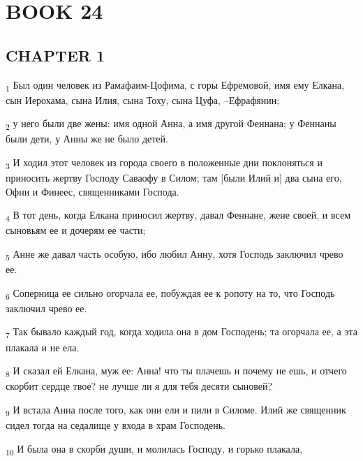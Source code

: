 \section{BOOK 24}
\subsection{CHAPTER 1}
\begin{tcolorbox}
\textsubscript{1} Был один человек из Рамафаим-Цофима, с горы Ефремовой, имя ему Елкана, сын Иерохама, сына Илия, сына Тоху, сына Цуфа, --Ефрафянин;
\end{tcolorbox}
\begin{tcolorbox}
\textsubscript{2} у него были две жены: имя одной Анна, а имя другой Феннана; у Феннаны были дети, у Анны же не было детей.
\end{tcolorbox}
\begin{tcolorbox}
\textsubscript{3} И ходил этот человек из города своего в положенные дни поклоняться и приносить жертву Господу Саваофу в Силом; там [были Илий и] два сына его, Офни и Финеес, священниками Господа.
\end{tcolorbox}
\begin{tcolorbox}
\textsubscript{4} В тот день, когда Елкана приносил жертву, давал Феннане, жене своей, и всем сыновьям ее и дочерям ее части;
\end{tcolorbox}
\begin{tcolorbox}
\textsubscript{5} Анне же давал часть особую, ибо любил Анну, хотя Господь заключил чрево ее.
\end{tcolorbox}
\begin{tcolorbox}
\textsubscript{6} Соперница ее сильно огорчала ее, побуждая ее к ропоту на то, что Господь заключил чрево ее.
\end{tcolorbox}
\begin{tcolorbox}
\textsubscript{7} Так бывало каждый год, когда ходила она в дом Господень; та огорчала ее, а эта плакала и не ела.
\end{tcolorbox}
\begin{tcolorbox}
\textsubscript{8} И сказал ей Елкана, муж ее: Анна! что ты плачешь и почему не ешь, и отчего скорбит сердце твое? не лучше ли я для тебя десяти сыновей?
\end{tcolorbox}
\begin{tcolorbox}
\textsubscript{9} И встала Анна после того, как они ели и пили в Силоме. Илий же священник сидел тогда на седалище у входа в храм Господень.
\end{tcolorbox}
\begin{tcolorbox}
\textsubscript{10} И была она в скорби души, и молилась Господу, и горько плакала,
\end{tcolorbox}
